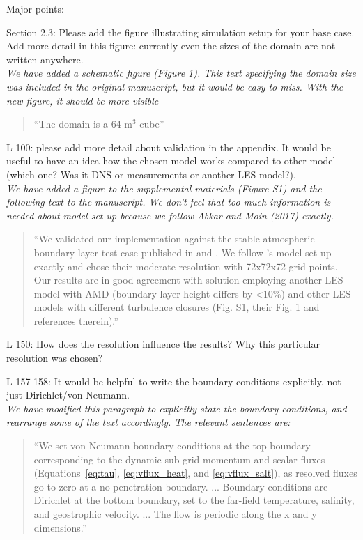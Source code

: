 \documentclass[tc, manuscript]{copernicus}
\begin{document}
Major points:\vspace{12pt}

Section 2.3: Please add the figure illustrating simulation setup for your base case. Add more detail in this figure: currently even the sizes of the domain are not written anywhere.\\
\textit{We have added a schematic figure (Figure 1). This text specifying the domain size was included in the original manuscript, but it would be easy to miss. With the new figure, it should be more visible}
\begin{quote}
``The domain is a 64 m$^3$ cube''
\end{quote}\vspace{12pt}

L 100: please add more detail about validation in the appendix. It would be useful to have an idea how the chosen model works compared to other model (which one? Was it DNS or measurements or another LES model?).\\
\textit{We have added a figure to the supplemental materials (Figure S1) and the following text to the manuscript. We don't feel that too much information is needed about model set-up because we follow Abkar and Moin (2017) exactly.}
\begin{quote}
``We validated our implementation against the stable atmospheric boundary layer test case published in \citet{abkar_large-eddy_2017} and \citet{stoll_large-eddy_2008}. We follow \citet[]['s]{abkar_large-eddy_2017}'s model set-up exactly and chose their moderate resolution with 72x72x72 grid points. Our results are in good agreement with \citet[]['s]{abkar_large-eddy_2017} solution employing another LES model with AMD (boundary layer height differs by <10\%) and other LES models with different turbulence closures (Fig. S1, their Fig. 1 and references therein).''
\end{quote}\vspace{12pt}

L 150: How does the resolution influence the results? Why this particular resolution was chosen?
\vspace{12pt}

L 157-158: It would be helpful to write the boundary conditions explicitly, not just Dirichlet/von Neumann. \\
\textit{We have modified this paragraph to explicitly state the boundary conditions, and rearrange some of the text accordingly. The relevant sentences are:}
\begin{quote}
``We set von Neumann boundary conditions at the top boundary corresponding to the dynamic sub-grid momentum and scalar fluxes (Equations~\ref{eq:tau}, \ref{eq:vflux_heat}, and \ref{eq:vflux_salt}), as resolved fluxes go to zero at a no-penetration boundary. ... Boundary conditions are Dirichlet at the bottom boundary, set to the far-field temperature, salinity, and geostrophic velocity. ... The flow is periodic along the x and y dimensions.''
\end{quote}\vspace{12pt}
\end{document}
